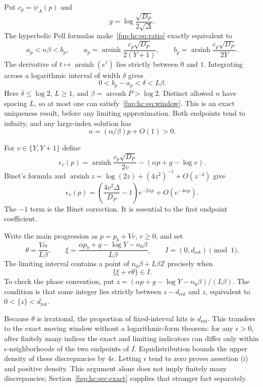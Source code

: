 \documentclass[11pt,letterpaper]{article}
\theoremstyle{definition}\newtheorem{definition}[theorem]{Definition}
\theoremstyle{remark}\newtheorem{remark}[theorem]{Remark}
\newcommand{\Z}{\mathbb Z}\newcommand{\Np}{\mathbb Z_{>0}}
\DeclareMathOperator{\arsinh}{arsinh}
\DeclareMathOperator{\arcosh}{arcosh}
\newcommand{\drot}{d_{\mathrm{rot}}}
\begin{document}
Put $c_p=\psi_A(p)$ and
\[
 g=\log\frac{\sqrt{D_P}}{2\sqrt\Delta}.
\]
The hyperbolic Pell formulas make~\eqref{fup:hc:eq:ratio} exactly equivalent to
\begin{equation}\label{fup:hc:eq:window}
 a_p<n\beta<b_p,\qquad
 a_p=\arsinh\frac{c_p\sqrt{D_P}}{2(Y+1)},\qquad
 b_p=\arsinh\frac{c_p\sqrt{D_P}}{2Y}.
\end{equation}
The derivative of $t\mapsto\arsinh(e^t)$ lies strictly between $0$ and $1$. Integrating across a logarithmic interval of width $\delta$ gives
\begin{equation}\label{fup:hc:eq:width}
 0<b_p-a_p<\delta<L\beta.
\end{equation}
Here $\delta\le\log2$, $L\ge1$, and $\beta=\arcosh P>\log2$. Distinct allowed $n$ have spacing $L$, so at most one can satisfy~\eqref{fup:hc:eq:window}. This is an exact uniqueness result, before any limiting approximation. Both endpoints tend to infinity, and any large-index solution has
\begin{equation}\label{fup:hc:eq:nsize}
 n=(\alpha/\beta)p+O(1)>0.
\end{equation}

For $v\in\{Y,Y+1\}$ define
\[
 \epsilon_v(p)=\arsinh\frac{c_p\sqrt{D_P}}{2v}
       -(\alpha p+g-\log v).
\]
Binet's formula and $\arsinh z=\log(2z)+(4z^2)^{-1}+O(z^{-4})$ give
\begin{equation}\label{fup:hc:eq:endpoint}
 \epsilon_v(p)=\left(\frac{4v^2\Delta}{D_P}-1\right)e^{-2\alpha p}
                    +O(e^{-4\alpha p}).
\end{equation}
The $-1$ term is the Binet correction. It is essential to the first endpoint coefficient.

Write the main progression as $p=p_b+Vr$, $r\ge0$, and set
\begin{equation}\label{fup:hc:eq:rotation}
 \theta=\frac{V\alpha}{L\beta},\qquad
 \xi=\frac{\alpha p_b+g-\log Y-n_0\beta}{L\beta},\qquad
 I=(0,\drot)\pmod1.
\end{equation}
The limiting interval contains a point of $n_0\beta+L\beta\Z$ precisely when
\begin{equation}\label{fup:hc:eq:limtest}
 \{\xi+r\theta\}\in I.
\end{equation}
To check the phase convention, put $z=(\alpha p+g-\log Y-n_0\beta)/(L\beta)$. The condition is that some integer lies strictly between $z-\drot$ and $z$, equivalent to $0<\{z\}<\drot$.

Because $\theta$ is irrational, the proportion of fixed-interval hits is $\drot$. This transfers to the exact moving window without a logarithmic-form theorem: for any $\epsilon>0$, after finitely many indices the exact and limiting indicators can differ only within $\epsilon$-neighborhoods of the two endpoints of $I$. Equidistribution bounds the upper density of these discrepancies by $4\epsilon$. Letting $\epsilon$ tend to zero proves assertion (i) and positive density. This argument alone does not imply finitely many discrepancies; Section~\ref{fup:hc:sec:exact} supplies that stronger fact separately.
\end{document}
